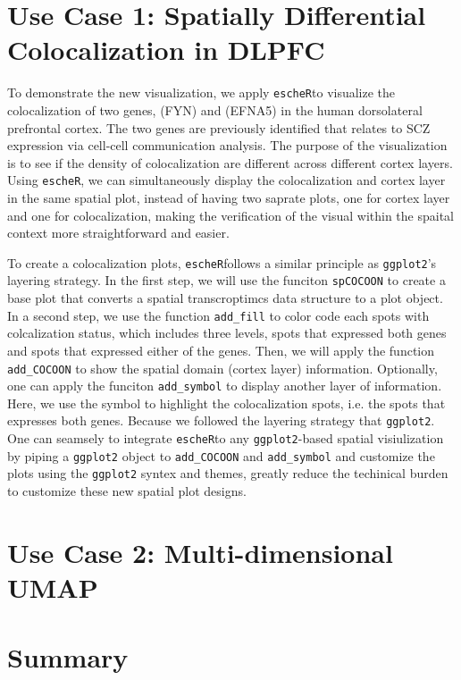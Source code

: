 \documentclass[11pt]{article}
\newcommand{\coloc}{\texttt{escheR}}
\begin{document}
\section*{Use Case 1: Spatially Differential Colocalization in DLPFC}
To demonstrate the new visualization, we apply \coloc to visualize the colocalization of two genes, (FYN) and (EFNA5) in the human dorsolateral prefrontal cortex. The two genes are previously identified that relates to SCZ expression via cell-cell communication analysis. The purpose of the visualization is to see if the density of colocalization are different across different cortex layers. Using \coloc, we can simultaneously display the colocalization and cortex layer in the same spatial plot, instead of having two saprate plots, one for cortex layer and one for colocalization, making the verification of the visual within the spaital context more straightforward and easier. 

To create a colocalization plots, \coloc follows a similar principle as \texttt{ggplot2}'s layering strategy. In the first step, we will use the funciton \texttt{spCOCOON} to create a base plot that converts a spatial transcroptimcs data structure to a plot object. In a second step, we use the function \texttt{add\_fill} to color code each spots with colcalization status, which includes three levels, spots that expressed both genes and spots that expressed either of the genes. Then, we will apply the function \texttt{add\_COCOON} to show the spatial domain (cortex layer) information. Optionally, one can apply the funciton \texttt{add\_symbol} to display another layer of information. Here, we use  the symbol to highlight the colocalization spots, i.e. the spots that expresses both genes. Because we followed the layering strategy that \texttt{ggplot2}. One can seamsely to integrate \coloc to any \texttt{ggplot2}-based spatial visiulization by piping a \texttt{ggplot2} object to \texttt{add\_COCOON} and \texttt{add\_symbol} and customize the plots using the \texttt{ggplot2} syntex and themes, greatly reduce the techinical burden to customize these new spatial plot designs.  

\section*{Use Case 2: Multi-dimensional UMAP}


\section*{Summary}
\end{document}

